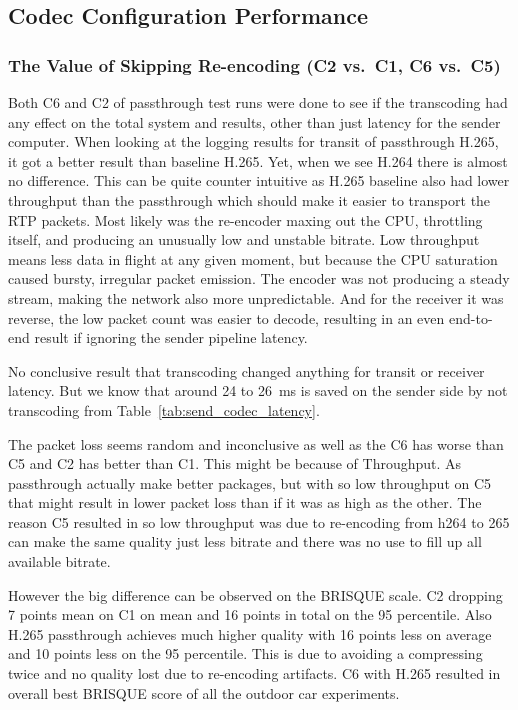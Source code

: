 \subsection{Codec Configuration Performance}\label{subsec:disc_codec}

\subsubsection{The Value of Skipping Re-encoding (C2 vs.\ C1, C6 vs.\ C5)}\label{subsubsec:no_transcode}

Both C6 and C2 of passthrough test runs were done to see if the transcoding had any effect on the total system and results, other than just latency for the sender computer. When looking at the logging results for transit of passthrough H.265, it got a better result than baseline H.265. Yet, when we see H.264 there is almost no difference. This can be quite counter intuitive as H.265 baseline also had lower throughput than the passthrough which should make it easier to transport the RTP packets. Most likely was the re-encoder maxing out the CPU, throttling itself, and producing an unusually low and unstable bitrate. Low throughput means less data in flight at any given moment, but because the CPU saturation caused bursty, irregular packet emission. The encoder was not producing a steady stream, making the network also more unpredictable.
And for the receiver it was reverse, the low packet count was easier to decode, resulting in an even end-to-end result if ignoring the sender pipeline latency.



No conclusive result that transcoding changed anything for transit or receiver latency. But we know that around 24 to 26~ms is saved on the sender side by not transcoding from Table~\ref{tab:send_codec_latency}.

The packet loss seems random and inconclusive as well as the C6 has worse than C5 and C2 has better than C1. This might be because of Throughput. As passthrough actually make better packages, but with so low throughput on C5 that might result in lower packet loss than if it was as high as the other. The reason C5 resulted in so low throughput was due to re-encoding from h264 to 265 can make the same quality just less bitrate and there was no use to fill up all available bitrate.

However the big difference can be observed on the BRISQUE scale. C2 dropping 7 points mean on C1 on mean and 16 points in total on the 95 percentile. Also H.265 passthrough achieves much higher quality with 16 points less on average and 10 points less on the 95 percentile. This is due to avoiding a compressing twice and no quality lost due to re-encoding artifacts. C6 with H.265 resulted in overall best BRISQUE score of all the outdoor car experiments. 

